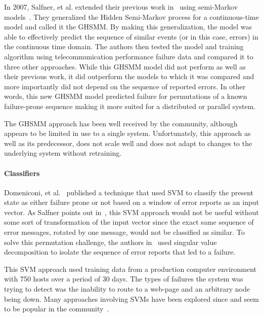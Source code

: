 In 2007, Salfner, et al. extended their previous work in~\cite{salfner2006}
using semi-Markov models~\cite{salfner2007}.  They generalized the Hidden
Semi-Markov process for a continuous-time model and called it the \ac{GHSMM}.
By making this generalization, the model was able to effectively predict the
sequence of similar events (or in this case, errors) in the continuous time
domain.  The authors then tested the model and training algorithm using
telecommunication performance failure data and compared it to three other
approaches.  While this \ac{GHSMM} model did not perform as well as their
previous work, it did outperform the models to which it was compared and more
importantly did not depend on the sequence of reported errors.  In other words,
this new \ac{GHSMM} model predicted failure for permutations of a known
failure-prone sequence making it more suited for a distributed or parallel
system.

The \ac{GHSMM} approach has been well received by the community, although
appears to be limited in use to a single system.  Unfortunately, this approach
as well as its predecessor, does not scale well and does not adapt to changes
to the underlying system without retraining.

\paragraph{Classifiers}
Domeniconi, et al.~\cite{domeniconi2002} published a technique that used
\ac{SVM} to classify the present state as either failure prone or not based on
a window of error reports as an input vector.  As Salfner points out
in~\cite{salfnerSurvey}, this \ac{SVM} approach would not be useful without
some sort of transformation of the input vector since the exact same sequence
of error messages, rotated by one message, would not be classified as similar.
To solve this permutation challenge, the authors in~\cite{domeniconi2002} used
singular value decomposition to isolate the sequence of error reports that led
to a failure.

This \ac{SVM} approach used training data from a production computer
environment with 750 hosts over a period of 30 days.  The types of failures the
system was trying to detect was the inability to route to a web-page and an
arbitrary node being down.  Many approaches involving \ac{SVM}s have been
explored since and seem to be popular in the community~\cite{fronza2013,
fulp2008, murray2005, domeniconi2002, irrera2015}.

